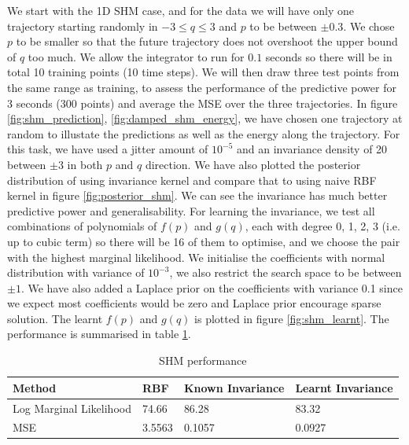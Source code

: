 \documentclass{statsmsc}
\begin{document}
We start with the 1D SHM case, and for the data we will have only one trajectory starting randomly in $-3\le q\le3$ and $p$ to be between $\pm 0.3$.
We chose $p$ to be smaller so that the future trajectory does not overshoot the upper bound of $q$ too much. 
We allow the integrator to run for $0.1$ seconds so there will be in total 10 training points (10 time steps). 
We will then draw three test points from the same range as training, to assess the performance of the predictive power for 3 seconds (300 points) and average the MSE over the three trajectories. 
In figure \ref{fig:shm_prediction}, \ref{fig:damped_shm_energy}, we have chosen one trajectory at random to illustate the predictions as well as the energy along the trajectory.
For this task, we have used a jitter amount of $10^{-5}$ and an invariance density of 20 between $\pm 3$ in both $p$ and $q$ direction.
We have also plotted the posterior distribution of using invariance kernel and compare that to using naive RBF kernel in figure \ref{fig:posterior_shm}.
We can see the invariance has much better predictive power and generalisability.
For learning the invariance, we test all combinations of polynomials of $f(p)$ and $g(q)$, each with degree 0, 1, 2, 3 (i.e. up to cubic term) so there will be 16 of them to optimise, and we choose the pair with the highest marginal likelihood. 
We initialise the coefficients with normal distribution with variance of $10^{-3}$, we also restrict the search space to be between $\pm 1$.
We have also added a Laplace prior on the coefficients with variance 0.1 since we expect most coefficients would be zero and Laplace prior encourage sparse solution.
The learnt $f(p)$ and $g(q)$ is plotted in figure \ref{fig:shm_learnt}.
The performance is summarised in table \ref{tab:shm_performance}.

\begin{table}[H]
  \centering
  \begin{tabular}{l l l l }
\hline
Method           & RBF & Known Invariance&  Learnt Invariance\\
  \hline
Log Marginal Likelihood & 74.66 & 86.28 & 83.32  \\
MSE & 3.5563 & 0.1057 & 0.0927 \\
                    \hline
  \end{tabular}
  \caption{SHM performance}
  \label{tab:shm_performance}
\end{table}
\end{document}
